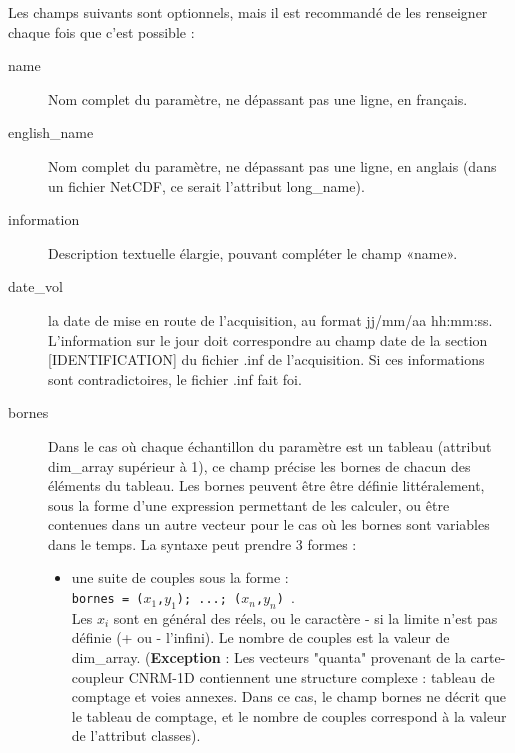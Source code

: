   Les champs suivants sont optionnels, mais il est recommandé de les
renseigner chaque fois que c'est possible :
\begin{description}
   \item[name] Nom complet du paramètre, ne dépassant pas une
ligne, en français.
   \item[english\_name] Nom complet du paramètre, ne dépassant 
pas une ligne, en anglais (dans un fichier NetCDF, ce serait l'attribut
\textsf{long\_name}).
   \item[information] Description textuelle élargie, pouvant compléter 
le champ «name». 
  \item[date\_vol] la date de mise en route de l'acquisition, au 
format \textsf{jj/mm/aa hh\string:mm\string:ss}. L'information
sur le jour doit correspondre au champ date de la section [IDENTIFICATION]
du fichier .inf de l'acquisition. Si ces informations sont contradictoires,
le fichier .inf fait foi.
   \item[bornes] Dans le cas où chaque échantillon du paramètre est un 
tableau (attribut \textsf{dim\_array} supérieur à 1), ce champ précise 
les bornes de chacun des éléments du tableau.
Les bornes peuvent être être définie littéralement, sous la forme d'une expression permettant de les
calculer, ou être contenues dans un autre vecteur pour le cas où les bornes sont variables dans le temps.
La syntaxe peut prendre 3 formes :
\begin{itemize}
\item une suite de couples sous la forme :\\
\texttt{bornes = ($x_1$,$y_1$); ...; ($x_n$,$y_n$) }.\\
Les $x_i$ sont en général des réels, ou le caractère - si la
limite n'est pas définie (+ ou - l'infini). Le nombre de
couples est la valeur de \textsf{dim\_array}. (\textbf{Exception} : Les
vecteurs "quanta" provenant de la carte-coupleur \textsc{CNRM-1D} contiennent
une structure complexe : tableau de comptage et voies annexes. Dans 
ce cas, le champ \textsf{bornes} ne décrit que le tableau de comptage,
et le nombre de couples correspond à la valeur de l'attribut \textsf{classes}).


\end{itemize}
\end{description}
